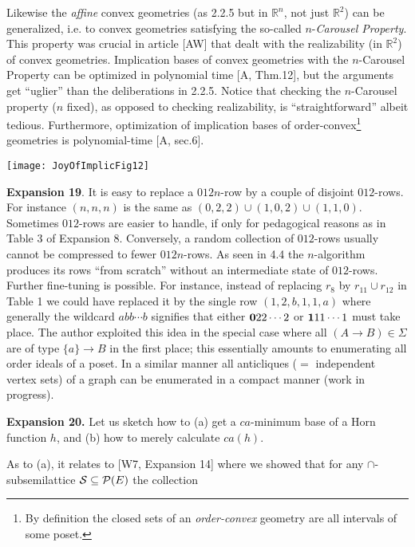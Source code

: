 \documentclass[11pt]{article}
\newcommand{\R}{\mathbb{R}}
\newcommand{\ra}{\rightarrow}
\begin{document}
Likewise the {\it affine} convex geometries (as 2.2.5 but in $\R^n$, not just $\R^2$) can be generalized, i.e. to convex geometries satisfying  the so-called $n$-{\it Carousel Property}. This property was crucial in article [AW] that dealt with the realizability (in $\R^2$) of convex geometries. Implication bases of convex geometries with the $n$-Carousel Property can  be optimized in polynomial time [A, Thm.12], but the arguments get 	``uglier'' than the deliberations in 2.2.5. Notice that checking the $n$-Carousel property ($n$ fixed), as opposed to checking realizability, is ``straightforward'' albeit tedious. Furthermore, optimization of implication bases of order-convex\footnote{By definition the closed sets of an {\it order-convex} geometry are all intervals of some poset.} geometries is polynomial-time [A, sec.6].

 

\begin{center}
\texttt{[image: JoyOfImplicFig12]}
\end{center}
 
{\bf Expansion 19}. It is easy to replace a $012n$-row by a couple of disjoint $012$-rows. For instance $(n,n,n)$ is the same as $(0,2,2) \cup (1,0,2) \cup (1,1,0)$. 
Sometimes $012$-rows are easier to handle, if only for pedagogical reasons as in Table 3 of Expansion 8. Conversely, a random collection of $012$-rows usually cannot be compressed to fewer $012n$-rows. As seen in 4.4 the $n$-algorithm produces its rows ``from scratch'' without an intermediate state of $012$-rows.
Further fine-tuning is possible. For instance, instead of replacing $r_8$ by $r_{11} \cup r_{12}$ in Table 1 we could have replaced it by the single row $(1, 2, b, 1, 1, a)$ where generally the wildcard $abb\cdots b$ signifies that either ${\bf 0}22\cdots 2$ or ${\bf 1}11\cdots 1$ must take place. 
The author exploited this idea in the special case where all $(A\ra B) \in \Sigma$ are of type $\{a\} \ra B$ in the first place; this essentially amounts to enumerating all order ideals of a poset. 
In a similar manner all anticliques ($=$ independent vertex sets) of a graph can be enumerated in a compact manner (work in progress). 
 
 

{\bf Expansion 20.} Let us sketch how to (a) get a $ca$-minimum base of a Horn function $h$, and (b) how to merely calculate $ca(h)$.

As to (a), it relates to [W7, Expansion 14] where we showed that for any $\cap$-subsemilattice ${\cal S} \subseteq {\cal P}(E)$ the collection
\end{document}
